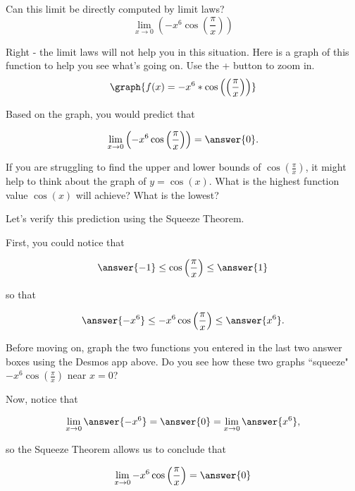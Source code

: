 \documentclass[handout]{ximera}
\begin{document}
\begin{exercise}
Can this limit be directly computed by limit laws?
  \[
  \displaystyle\lim_{x\to 0} \left(-x^6\cos\left(\frac{\pi}{x}\right)\right)
  \]
  
  \begin{multipleChoice}
  \end{multipleChoice}
  
\begin{exercise}
  
Right - the limit laws will not help you in this situation.  Here is a graph of this function to help you see what's going on.  Use the + button to zoom in.
  \[
   \graph{f(x)=-x^6*\cos\left(\left(\frac{\pi}{x}\right)\right)}
  \]
  
Based on the graph, you would predict that 

\[
  \displaystyle\lim_{x\to 0} \left(-x^6\cos\left(\frac{\pi}{x}\right)\right) = \answer{0}.
  \]
\begin{exercise}

\begin{hint}
If you are struggling to find the upper and lower bounds of  $\cos\left(\frac{\pi}{x}\right)$, it might help to think about the graph of $y = \cos(x)$.  What is the highest function value $\cos(x)$ will achieve?  What is the lowest? 
\end{hint}

Let's verify this prediction using the Squeeze Theorem.
 
First, you could notice that

\[ \answer{-1} \leq \cos\left(\frac{\pi}{x}\right) \leq \answer{1} \]

so that
   
\[ \answer{-x^6} \leq -x^6\cos\left(\frac{\pi}{x}\right) \leq \answer{x^6}. \]

Before moving on, graph the two functions you entered in the last two answer boxes using the Desmos app above.  Do you see how these two graphs ``squeeze" $-x^6\cos\left(\frac{\pi}{x}\right)$ near $x=0$?

Now, notice that 

\[ \displaystyle\lim_{x \to 0} \answer{-x^6} = \answer{0} = \displaystyle\lim_{x \to 0} \answer{x^6},\]

so the Squeeze Theorem allows us to conclude that 

\[ \displaystyle\lim_{x \to 0}  -x^6\cos\left(\frac{\pi}{x}\right) = \answer{0} \]

\end{exercise}
\end{exercise}
\end{exercise}
\end{document}
